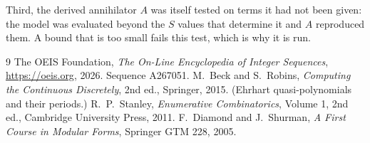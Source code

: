 \documentclass[11pt,a4paper]{article}
\theoremstyle{plain}
\theoremstyle{definition}
\begin{document}
Third, the derived annihilator $A$ was itself tested on terms it had not been given: the model
was evaluated beyond the $S$ values that determine it and $A$ reproduced them. A bound that is
too small fails this test, which is why it is run.

\begin{thebibliography}{9}
 The OEIS Foundation, \emph{The On-Line Encyclopedia of Integer
Sequences}, \url{https://oeis.org}, 2026. Sequence A267051.
 M.~Beck and S.~Robins, \emph{Computing the Continuous Discretely},
2nd ed., Springer, 2015. (Ehrhart quasi-polynomials and their periods.)
 R.~P.~Stanley, \emph{Enumerative Combinatorics}, Volume 1, 2nd ed.,
Cambridge University Press, 2011.
 F.~Diamond and J.~Shurman, \emph{A First Course in Modular Forms},
Springer GTM 228, 2005.
\end{thebibliography}
\end{document}
